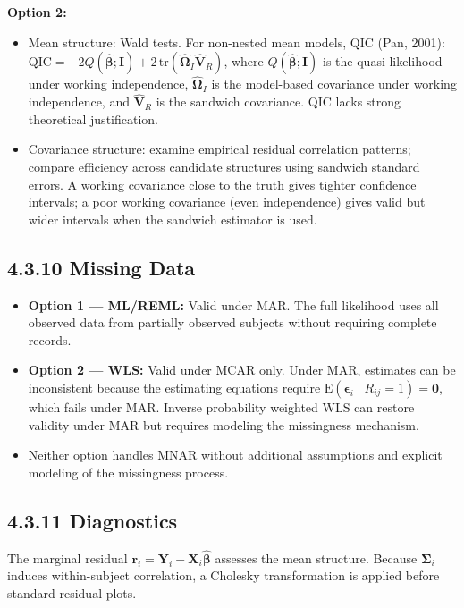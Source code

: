 \documentclass[11pt]{article}
\newcommand{\bY}{\mathbf{Y}}
\newcommand{\bX}{\mathbf{X}}
\newcommand{\bbeta}{\boldsymbol{\beta}}
\newcommand{\bepsilon}{\boldsymbol{\epsilon}}
\newcommand{\bSigma}{\boldsymbol{\Sigma}}
\newcommand{\E}{\mathrm{E}}
\begin{document}
\textbf{Option 2:}
\begin{itemize}[leftmargin=2em]
  \item Mean structure: Wald tests. For non-nested mean models, QIC (Pan, 2001): $\text{QIC} = -2Q(\hat{\bbeta}; \mathbf{I}) + 2\,\mathrm{tr}(\hat{\boldsymbol{\Omega}}_I\hat{\mathbf{V}}_R)$, where $Q(\hat{\bbeta}; \mathbf{I})$ is the quasi-likelihood under working independence, $\hat{\boldsymbol{\Omega}}_I$ is the model-based covariance under working independence, and $\hat{\mathbf{V}}_R$ is the sandwich covariance. QIC lacks strong theoretical justification.
  \item Covariance structure: examine empirical residual correlation patterns; compare efficiency across candidate structures using sandwich standard errors. A working covariance close to the truth gives tighter confidence intervals; a poor working covariance (even independence) gives valid but wider intervals when the sandwich estimator is used.
\end{itemize}

\subsection*{4.3.10 Missing Data}

\begin{itemize}[leftmargin=2em]
  \item \textbf{Option 1 --- ML/REML:} Valid under MAR. The full likelihood uses all observed data from partially observed subjects without requiring complete records.
  \item \textbf{Option 2 --- WLS:} Valid under MCAR only. Under MAR, estimates can be inconsistent because the estimating equations require $\E(\bepsilon_i \mid R_{ij} = 1) = \mathbf{0}$, which fails under MAR. Inverse probability weighted WLS can restore validity under MAR but requires modeling the missingness mechanism.
  \item Neither option handles MNAR without additional assumptions and explicit modeling of the missingness process.
\end{itemize}

\subsection*{4.3.11 Diagnostics}

The marginal residual $\mathbf{r}_i = \bY_i - \bX_i\hat{\bbeta}$ assesses the mean structure. Because $\bSigma_i$ induces within-subject correlation, a Cholesky transformation is applied before standard residual plots.
\end{document}

